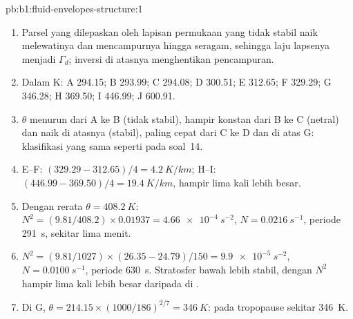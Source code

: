 \begin{solution}{pb:b1:fluid-envelopes-structure:1}
\begin{enumerate}
        sehingga kenaikannya terhenti.
  \item Parsel yang dilepaskan oleh lapisan permukaan yang tidak stabil naik melewatinya
        dan mencampurnya hingga  seragam, sehingga laju lapsenya
        menjadi $\Gamma_d$; inversi di atasnya menghentikan pencampuran.
  \item Dalam K: A 294.15; B 293.99; C 294.08; D 300.51; E 312.65; F 329.29; G
        346.28; H 369.50; I 446.99; J 600.91.
  \item $\theta$ menurun dari A ke B (tidak stabil), hampir konstan dari B ke
        C (netral) dan naik di atasnya (stabil), paling cepat dari C ke D dan di atas
        G: klasifikasi yang sama seperti pada soal~14.
  \item E--F: $(329.29 - 312.65)/4 = \qty{4.2}{K/km}$; H--I: $(446.99 -
        369.50)/4 = \qty{19.4}{K/km}$, hampir lima kali lebih besar.
  \item Dengan rerata $\theta = \qty{408.2}{K}$: $N^2 = (9.81/408.2) \times
        0.01937 = \qty{4.66e-4}{s^{-2}}$, $N = \qty{0.0216}{s^{-1}}$, periode
        \qty{291}{s}, sekitar lima menit.
  \item $N^2 = (9.81/1027) \times (26.35 - 24.79)/150 = \qty{9.9e-5}{s^{-2}}$,
        $N = \qty{0.0100}{s^{-1}}$, periode \qty{630}{s}. Stratosfer bawah lebih stabil,
        dengan $N^2$ hampir lima kali lebih besar daripada di .
  \item Di G, $\theta = 214.15 \times (1000/186)^{2/7} = \qty{346}{K}$:  pada tropopause sekitar \qty{346}{K}.
\end{enumerate}
\end{solution}
